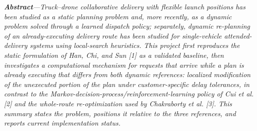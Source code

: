 \documentclass[10pt,a4paper]{article}
\begin{document}


\textit{\textbf{Abstract}---Truck--drone collaborative delivery with
flexible launch positions has been studied as a static planning
problem and, more recently, as a dynamic problem solved through a
learned dispatch policy; separately, dynamic re-planning of an
already-executing delivery route has been studied for single-vehicle
attended-delivery systems using local-search heuristics. This project
first reproduces the static formulation of Han, Chi, and Sun [1] as a
validated baseline, then investigates a computational mechanism for
requests that arrive while a plan is already executing that differs
from both dynamic references: localized modification of the unexecuted
portion of the plan under customer-specific delay tolerances, in
contrast to the Markov-decision-process/reinforcement-learning policy
of Cui et al. [2] and the whole-route re-optimization used by
Chakraborty et al. [3]. This summary states the problem, positions it
relative to the three references, and reports current implementation
status.}
\end{document}
